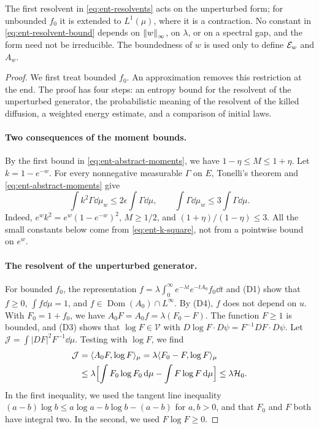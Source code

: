 The first resolvent in \eqref{eq:ent-resolvents} acts on the unperturbed
form; for unbounded $f_0$ it is extended to $L^1(\mu)$, where it is a
contraction. No constant in \eqref{eq:ent-resolvent-bound} depends on
$\left\lVert w\right\rVert_\infty$, on $\lambda$, or on a spectral gap, and the form need not
be irreducible. The boundedness of $w$ is used only to define $\mathcal E_w$ and
$A_w$.

\begin{proof}
We first treat bounded $f_0$. An approximation removes this restriction at
the end. The proof has four steps: an entropy bound for the resolvent of the
unperturbed generator, the probabilistic meaning of the resolvent of the
killed diffusion, a weighted energy
estimate, and a comparison of initial laws.

\paragraph{Two consequences of the moment bounds.}
By the first bound in \eqref{eq:ent-abstract-moments}, we have
$1-\eta\le M\le1+\eta$. Let $k=1-e^{-w}$. For every nonnegative measurable
$\Gamma$ on $E$, Tonelli's theorem and \eqref{eq:ent-abstract-moments} give
\begin{equation}\label{eq:ent-k-square}
 \int k^2\Gamma\dd\mu_w\le2\epsilon\int\Gamma\dd\mu,\qquad
 \int\Gamma\dd\mu_w\le3\int\Gamma\dd\mu .
\end{equation}
Indeed, $e^wk^2=e^w(1-e^{-w})^2$, $M\ge1/2$, and $(1+\eta)/(1-\eta)\le3$.
All the small constants below come from \eqref{eq:ent-k-square}, not from a
pointwise bound on $e^w$.

\paragraph{The resolvent of the unperturbed generator.}
For bounded $f_0$, the representation
$f=\lambda\int_0^\infty e^{-\lambda t}e^{-tA_0}f_0\dd t$ and (D1) show that
$f\ge0$, $\int f\dd\mu=1$, and $f\in\operatorname{Dom}(A_0)\cap L^\infty$.
By (D4), $f$ does not depend on $u$. With $F_0=1+f_0$, we have
$A_0F=A_0f=\lambda(F_0-F)$. The function $F\ge1$ is bounded, and (D3) shows that
$\log F\in\mathcal V$ with $D\log F\cdot D\psi=F^{-1}DF\cdot D\psi$. Let
$\mathcal J=\int|DF|^2F^{-1}\dd\mu$. Testing with $\log F$, we find
\begin{equation}\label{eq:ent-fisher}
 \begin{split}
 \mathcal J&=\langle A_0F,\log F\rangle_\mu=\lambda\langle F_0-F,\log F\rangle_\mu\\
 &\le\lambda\Bigl[\int F_0\log F_0\,\mathrm d\mu-\int F\log F\,\mathrm d\mu\Bigr]
 \le\lambda\mathcal H_0 .
 \end{split}
\end{equation}
In the first inequality, we used the tangent line inequality
$(a-b)\log b\le a\log a-b\log b-(a-b)$ for $a,b>0$, and that $F_0$ and $F$
both have integral two. In the second, we used $F\log F\ge0$.


\end{proof}
